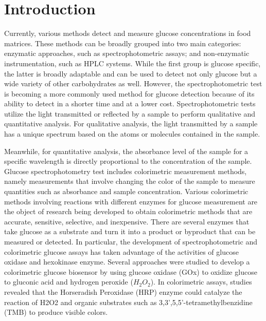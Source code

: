 \documentclass[conference]{IEEEtran}
\begin{document}
\section{Introduction}
Currently, various methods detect and measure glucose concentrations in food matrices.
These methods can be broadly grouped into two main categories: enzymatic approaches, such as spectrophotometric assays; and non-enzymatic instrumentation, such as HPLC systems.
While the first group is glucose specific, the latter is broadly adaptable and can be used to detect not only glucose but a wide variety of other carbohydrates as well\cite{b1}.
However, the spectrophotometric test is becoming a more commonly used method for glucose detection because of its ability to detect in a shorter time and at a lower cost.
Spectrophotometric tests utilize the light transmitted or reflected by a sample to perform qualitative and quantitative analysis.
For qualitative analysis, the light transmitted by a sample has a unique spectrum based on the atoms or molecules contained in the sample.  

Meanwhile, for quantitative analysis, the absorbance level of the sample for a specific wavelength is directly proportional to the concentration of the sample.
Glucose spectrophotometry test includes colorimetric measurement methods, namely measurements that involve changing the color of the sample to measure quantities such as absorbance and sample concentration.
Various colorimetric methods involving reactions with different enzymes for glucose measurement are the object of research being developed to obtain colorimetric methods that are accurate, sensitive, selective, and inexpensive.
There are several enzymes that take glucose as a substrate and turn it into a product or byproduct that can be measured or detected.
In particular, the development of spectrophotometric and colorimetric glucose assays has taken advantage of the activities of glucose oxidase and hexokinase enzyme\cite{b1}.
Several approaches were studied to develop a colorimetric glucose biosensor by using glucose oxidase (GOx) to oxidize glucose to gluconic acid and hydrogen peroxide ($H_2O_2$).
In colorimetric assays, studies revealed that the Horseradish Peroxidase (HRP) enzyme could catalyze the reaction of H2O2 and organic substrates such as 3,3',5,5'-tetramethylbenzidine (TMB) to produce visible colors\cite{b2}. 
\end{document}
